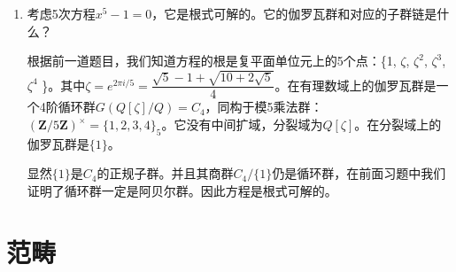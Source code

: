 \documentclass[UTF8]{article}
\begin{document}
\begin{enumerate}
\item {考虑5次方程$x^5 - 1 = 0$，它是根式可解的。它的伽罗瓦群和对应的子群链是什么？}

根据前一道题目，我们知道方程的根是复平面单位元上的5个点：\{1, $\zeta$, $\zeta^2$, $\zeta^3$, $\zeta^4$ \}。其中$\zeta = e^{2 \pi i / 5} = \dfrac{\sqrt{5} - 1 + \sqrt{10 + 2 \sqrt{5}}}{4}$。在有理数域上的伽罗瓦群是一个4阶循环群$G(Q[\zeta]/Q) = C_4$，同构于模5乘法群：$(\pmb{Z}/5\pmb{Z})^{\times} = \{1, 2, 3, 4 \}_5$。它没有中间扩域，分裂域为$Q[\zeta]$。在分裂域上的伽罗瓦群是$\{1\}$。

显然$\{1\}$是$C_4$的正规子群。并且其商群$C_4/\{1\}$仍是循环群，在前面习题中我们证明了循环群一定是阿贝尔群。因此方程是根式可解的。

\end{enumerate}

\section{范畴}
\end{document}
